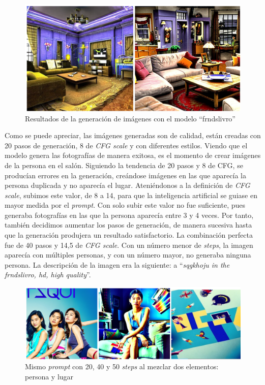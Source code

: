 \begin{figure}[!htb]
	\centering
	\includegraphics[width = 1
	\textwidth]{Imagenes/Vectorial/resultadosfrndslivro.png}
	\caption{Resultados de la generación de imágenes con el modelo ``frndslivro''}
	\label{fig:resultsfrnds}
\end{figure}

Como se puede apreciar, las imágenes generadas son de calidad, están creadas con 20 pasos de generación, 8 de \textit{CFG scale} y con diferentes estilos. Viendo que el modelo genera las fotografías de manera exitosa, es el momento de crear imágenes de la persona en el salón. Siguiendo la tendencia de 20 pasos y 8 de CFG, se producían errores en la generación, creándose imágenes en las que aparecía la persona duplicada y no aparecía el lugar. Ateniéndonos a la definición de \textit{CFG scale}, subimos este valor, de 8 a 14, para que la inteligencia artificial se guiase en mayor medida por el \textit{prompt}. Con solo subir este valor no fue suficiente, pues generaba fotografías en las que la persona aparecía entre 3 y 4 veces. Por tanto, también decidimos aumentar los pasos de generación, de manera sucesiva hasta que la generación produjera un resultado satisfactorio. La combinación perfecta fue de 40 pasos y 14,5 de \textit{CFG scale}. Con un número menor de \textit{steps}, la imagen aparecía con múltiples personas, y con un número mayor, no generaba ninguna persona. La descripción de la imagen era la siguiente: a ``\textit{sqgkhoju in the frndslivro, hd, high quality}''.\\

\begin{figure}[!htb]
	\centering
	\includegraphics[width = 1
	\textwidth]{Imagenes/Vectorial/resultadoshojuyfrnds.png}
	\caption{Mismo \textit{prompt} con 20, 40 y 50 \textit{steps} al mezclar dos elementos: persona y lugar}
	\label{fig:comphachi}
\end{figure}


